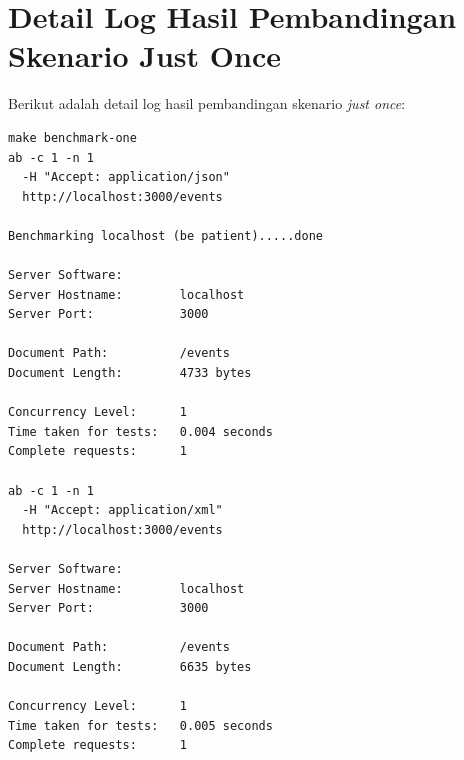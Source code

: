 \documentclass[a4paper, 12pt, oneside]{report}
\begin{document}
\chapter{Detail Log Hasil Pembandingan Skenario Just Once} \label{lampiran:detail-log-hasil-pembandingan-skenario-just-once}

Berikut adalah detail log hasil pembandingan skenario \textit{just once}:

\begin{lstlisting}[frame=single]
make benchmark-one 
ab -c 1 -n 1
  -H "Accept: application/json" 
  http://localhost:3000/events

Benchmarking localhost (be patient).....done

Server Software:        
Server Hostname:        localhost
Server Port:            3000

Document Path:          /events
Document Length:        4733 bytes

Concurrency Level:      1
Time taken for tests:   0.004 seconds
Complete requests:      1

ab -c 1 -n 1
  -H "Accept: application/xml"
  http://localhost:3000/events

Server Software:        
Server Hostname:        localhost
Server Port:            3000

Document Path:          /events
Document Length:        6635 bytes

Concurrency Level:      1
Time taken for tests:   0.005 seconds
Complete requests:      1
\end{lstlisting}
\end{document}
